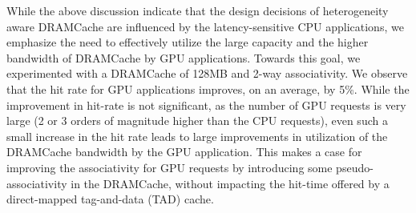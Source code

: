 
While the above discussion indicate that the design decisions of heterogeneity aware DRAMCache are influenced by the latency-sensitive CPU applications, we emphasize the need to effectively utilize the large capacity and the higher bandwidth of DRAMCache by GPU applications. Towards this goal, we experimented with a DRAMCache of 128MB and 2-way associativity. We observe that the hit rate for GPU applications improves, on an average, by 5\%. While the improvement in hit-rate is not significant, as the number of GPU requests is very large (2 or 3 orders of magnitude higher than the CPU requests), even such a small increase in the hit rate leads to large improvements in utilization of the DRAMCache bandwidth by the GPU application. This makes a case for improving the associativity for GPU requests by introducing some pseudo-associativity in the DRAMCache, without impacting the hit-time offered by a direct-mapped tag-and-data (TAD) cache.

